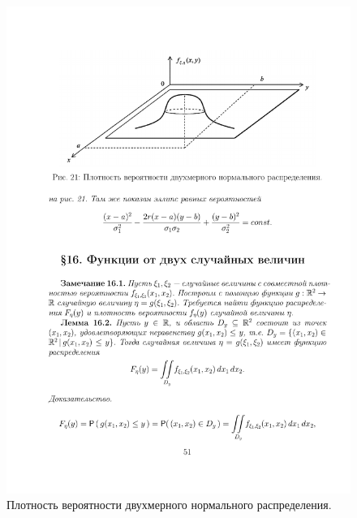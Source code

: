 \begin{example}
\begin{figure}[H]
	\includegraphics[]{pic/pic21}
	\caption{Плотность вероятности двухмерного нормального распределения.}
	\label{fig21}
\end{figure}
\end{example}
